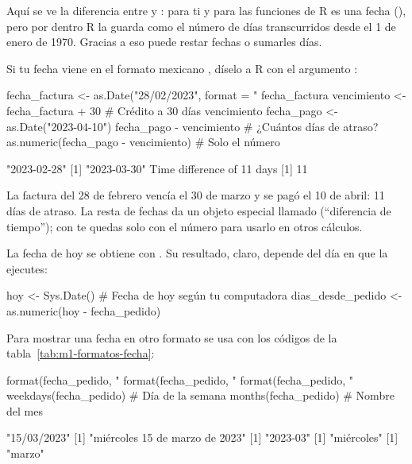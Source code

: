Aquí se ve la diferencia entre  y : para ti
y para las funciones de R es una fecha (), pero por dentro R la
guarda como el número de días transcurridos desde el 1 de enero de 1970.
Gracias a eso puede restar fechas o sumarles días.

Si tu fecha viene en el formato mexicano , díselo a R
con el argumento :

\begin{rcode}
fecha_factura <- as.Date("28/02/2023", format = "%
fecha_factura
vencimiento <- fecha_factura + 30          # Crédito a 30 días
vencimiento
fecha_pago <- as.Date("2023-04-10")
fecha_pago - vencimiento                   # ¿Cuántos días de atraso?
as.numeric(fecha_pago - vencimiento)       # Solo el número
\end{rcode}
\begin{rsalida}
[1] "2023-02-28"
[1] "2023-03-30"
Time difference of 11 days
[1] 11
\end{rsalida}

La factura del 28 de febrero vencía el 30 de marzo y se pagó el 10 de
abril: 11 días de atraso. La resta de fechas da un objeto especial llamado
 (``diferencia de tiempo''); con  te
quedas solo con el número para usarlo en otros cálculos.

La fecha de hoy se obtiene con . Su resultado, claro,
depende del día en que la ejecutes:

\begin{rcode}
hoy <- Sys.Date()                  # Fecha de hoy según tu computadora
dias_desde_pedido <- as.numeric(hoy - fecha_pedido)
\end{rcode}

Para mostrar una fecha en otro formato se usa  con los
códigos de la tabla~\ref{tab:m1-formatos-fecha}:

\begin{rcode}
format(fecha_pedido, "%
format(fecha_pedido, "%
format(fecha_pedido, "%
weekdays(fecha_pedido)                     # Día de la semana
months(fecha_pedido)                       # Nombre del mes
\end{rcode}
\begin{rsalida}
[1] "15/03/2023"
[1] "miércoles 15 de marzo de 2023"
[1] "2023-03"
[1] "miércoles"
[1] "marzo"
\end{rsalida}

